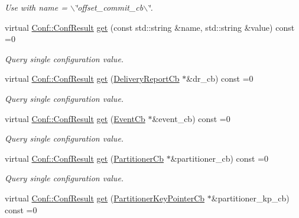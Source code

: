 \begin{DoxyCompactItemize}
\begin{DoxyCompactList}\small\item\em Use with {\ttfamily name} = {\ttfamily $\backslash$\char`\"{}offset\_\-commit\_\-cb$\backslash$\char`\"{}}. \item\end{DoxyCompactList}\item 
virtual \hyperlink{classRdKafka_1_1Conf_a1d023a689c09f42ab18b7bd1d15a11a6}{Conf::ConfResult} \hyperlink{classRdKafka_1_1Conf_af72e23916fb598c0b343a1235392a723}{get} (const std::string \&name, std::string \&value) const =0
\begin{DoxyCompactList}\small\item\em Query single configuration value. \item\end{DoxyCompactList}\item 
virtual \hyperlink{classRdKafka_1_1Conf_a1d023a689c09f42ab18b7bd1d15a11a6}{Conf::ConfResult} \hyperlink{classRdKafka_1_1Conf_af013485a0645e4c61158c35c85b9439c}{get} (\hyperlink{classRdKafka_1_1DeliveryReportCb}{DeliveryReportCb} $\ast$\&dr\_\-cb) const =0
\begin{DoxyCompactList}\small\item\em Query single configuration value. \item\end{DoxyCompactList}\item 
virtual \hyperlink{classRdKafka_1_1Conf_a1d023a689c09f42ab18b7bd1d15a11a6}{Conf::ConfResult} \hyperlink{classRdKafka_1_1Conf_a29cb41ccd5c9e4270bf354a56c3d66c1}{get} (\hyperlink{classRdKafka_1_1EventCb}{EventCb} $\ast$\&event\_\-cb) const =0
\begin{DoxyCompactList}\small\item\em Query single configuration value. \item\end{DoxyCompactList}\item 
virtual \hyperlink{classRdKafka_1_1Conf_a1d023a689c09f42ab18b7bd1d15a11a6}{Conf::ConfResult} \hyperlink{classRdKafka_1_1Conf_a76a2aeb01ec7bf6c09e70fbc804ce2cc}{get} (\hyperlink{classRdKafka_1_1PartitionerCb}{PartitionerCb} $\ast$\&partitioner\_\-cb) const =0
\begin{DoxyCompactList}\small\item\em Query single configuration value. \item\end{DoxyCompactList}\item 
virtual \hyperlink{classRdKafka_1_1Conf_a1d023a689c09f42ab18b7bd1d15a11a6}{Conf::ConfResult} \hyperlink{classRdKafka_1_1Conf_a8335a5c13d7241d3269cc356c95807c4}{get} (\hyperlink{classRdKafka_1_1PartitionerKeyPointerCb}{PartitionerKeyPointerCb} $\ast$\&partitioner\_\-kp\_\-cb) const =0

\end{DoxyCompactItemize}
